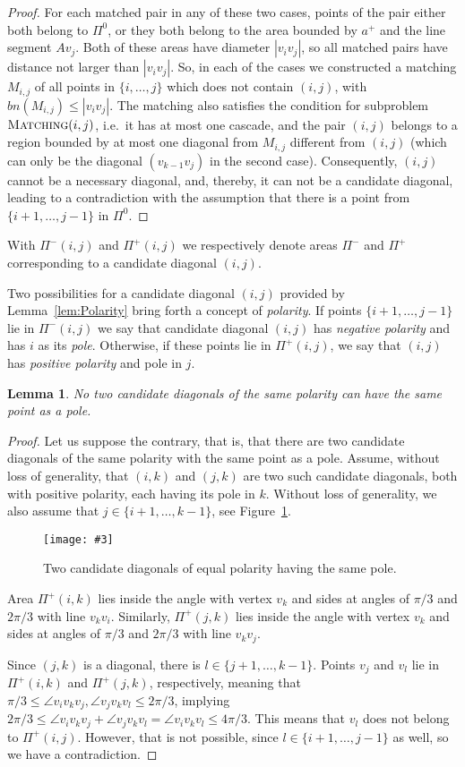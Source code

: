 \documentclass[a4paper, 11pt]{article}
\newtheorem{lemma}[theorem]{Lemma}
\newcommand{\fig}[3]{
	\begin{figure}[ht]
		\centering
		\texttt{[image: \#3]}
		\caption{#2}
		\label{#1}
	\end{figure}
}
\newcommand{\p}[2]{\{#1, \ldots, #2\}}
\newcommand{\pij}{\p{i}{j}}
\newcommand{\Matching}{\textsc{Matching}}
\begin{document}
\begin{proof}
	For each matched pair in any of these two cases, points of the pair either both belong to $\Pi^0$, or they both belong to the area bounded by $a^+$ and the line segment $Av_j$. Both of these areas have diameter $|v_iv_j|$, so all matched pairs have distance not larger than $|v_iv_j|$. So, in each of the cases we constructed a matching $M_{i,j}$ of all points in $\pij$ which does not contain $(i,j)$, with $bn(M_{i,j}) \leq |v_iv_j|$. The matching also satisfies the condition for subproblem $\Matching(i,j)$, i.e.\ it has at most one cascade, and the pair $(i,j)$ belongs to a region bounded by at most one diagonal from $M_{i,j}$ different from $(i,j)$ (which can only be the diagonal $(v_{k-1}v_j)$ in the second case). Consequently, $(i,j)$ cannot be a necessary diagonal, and, thereby, it can not be a candidate diagonal, leading to a contradiction with the assumption that there is a point from $\p{i+1}{j-1}$ in $\Pi^0$.
\end{proof}


With $\Pi^-(i,j)$ and $\Pi^+(i,j)$ we respectively denote areas $\Pi^-$ and $\Pi^+$ corresponding to a candidate diagonal $(i,j)$.

Two possibilities for a candidate diagonal $(i,j)$ provided by Lemma~\ref{lem:Polarity} bring forth a concept of \emph{polarity}. If points $\p{i+1}{j-1}$ lie in $\Pi^-(i,j)$ we say that candidate diagonal $(i,j)$ has \emph{negative polarity} and has $i$ as its \emph{pole}. Otherwise, if these points lie in $\Pi^+(i,j)$, we say that $(i,j)$ has \emph{positive polarity} and pole in $j$.


\begin{lemma}
	\label{lem:CandidatesDontTouch}
	No two candidate diagonals of the same polarity can have the same point as a pole.
\end{lemma}
\begin{proof}
	Let us suppose the contrary, that is, that there are two candidate diagonals of the same polarity with the same point as a pole. Assume, without loss of generality, that $(i,k)$ and $(j,k)$ are two such candidate diagonals, both with positive polarity, each having its pole in $k$. Without loss of generality, we also assume that $j \in \p{i+1}{k-1}$, see Figure~\ref{fig:CandidatesDontTouch}.	
	
	\fig{fig:CandidatesDontTouch}{Two candidate diagonals of equal polarity having the same pole.}{CandidatesNoTouching.pdf}
	
	Area $\Pi^+(i,k)$ lies inside the angle with vertex $v_k$ and sides at angles of $\pi/3$ and $2\pi/3$ with line $v_kv_i$. Similarly, $\Pi^+(j,k)$ lies inside the angle with vertex $v_k$ and sides at angles of $\pi/3$ and $2\pi/3$ with line $v_kv_j$.
		
	Since $(j,k)$ is a diagonal, there is $l \in \p{j+1}{k-1}$.	Points $v_j$ and $v_l$ lie in $\Pi^+(i,k)$ and $\Pi^+(j,k)$, respectively, meaning that $\pi/3 \leq \angle v_iv_kv_j, \angle v_jv_kv_l \leq 2\pi/3$, implying $2\pi/3 \leq \angle v_iv_kv_j + \angle v_jv_kv_l = \angle v_iv_kv_l \leq 4\pi/3$. This means that $v_l$ does not belong to $\Pi^+(i,j)$. However, that is not possible, since $l \in \p{i+1}{j-1}$ as well, so we have a contradiction.
\end{proof}
\end{document}
